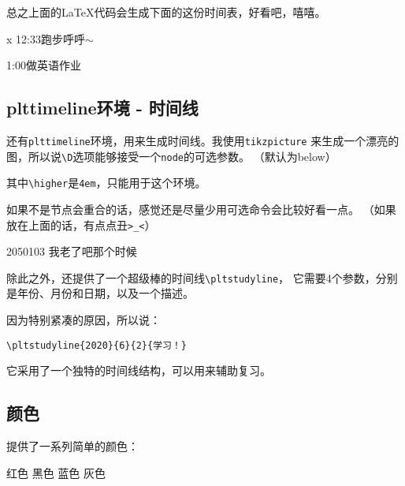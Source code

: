 \documentclass{peterlitsdoc}
\newcommand{\vb}{\verb}
\begin{document}
总之上面的\LaTeX{}代码会生成下面的这份时间表，好看吧，嘻嘻。

\begin{pltplan}
\item[x]{12:33}{跑步}{呼呼$\sim$}
\item[ ]{1:00}{做英语作业}{}
\end{pltplan}


\subsection{plttimeline环境 - 时间线}

还有\vb|plttimeline|环境，用来生成时间线。我使用\vb|tikzpicture|%
来生成一个漂亮的图，所以说\vb|\D|选项能够接受一个\vb|node|的可选参数。
（默认为below）

其中\vb|\higher|是\vb|4em|，只能用于这个环境。

如果不是节点会重合的话，感觉还是尽量少用可选命令会比较好看一点。
（如果放在上面的话，有点点丑\vb|>_<|）

\begin{pltrun}
\begin{plttimeline}{2050}{10}{3}
    {我老了吧那个时候}
\end{plttimeline}
\end{pltrun}

除此之外，还提供了一个超级棒的时间线\vb|\pltstudyline|，
它需要4个参数，分别是年份、月份和日期，以及一个描述。

因为特别紧凑的原因，所以说：

\begin{lstlisting}
\pltstudyline{2020}{6}{2}{学习！}
\end{lstlisting}


它采用了一个独特的时间线结构，可以用来辅助复习。


\subsection{颜色}

提供了一系列简单的颜色：

\begin{pltrun}
\pltred   红色\pltrule
\pltblack 黑色\pltrule
\pltblue  蓝色\pltrule
\pltgray  灰色\pltrule
\end{pltrun}
\end{document}
